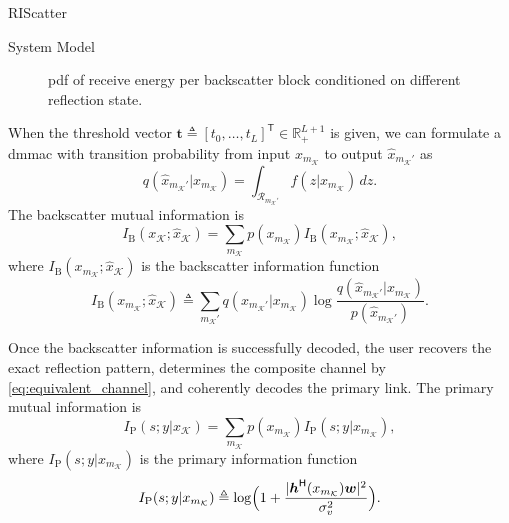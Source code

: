 \documentclass[journal]{IEEEtran}
\begin{document}
\begin{section}{RIScatter}
\begin{subsection}{System Model}
		\begin{figure}[!t]
			\centering
			\resizebox{0.8\columnwidth}{!}{
				
			}
			\caption{
				\gls{pdf} of receive energy per backscatter block conditioned on different reflection state.
			}
			\label{fg:energy_distribution}
		\end{figure}

		When the threshold vector $\boldsymbol{t} \triangleq [t_0,\ldots,t_L]^\mathsf{T} \in \mathbb{R}_+^{L+1}$ is given, we can formulate a \gls{dmmac} with transition probability from input $x_{m_{\mathcal{K}}}$ to output $\hat{x}_{m_{\mathcal{K}}'}$ as
		\begin{equation}
			q(\hat{x}_{m_{\mathcal{K}}'}|x_{m_{\mathcal{K}}}) = \int_{\mathcal{R}_{m_{\mathcal{K}}'}} f(z|x_{m_{\mathcal{K}}}) \, d z.
			\label{eq:dmmac}
		\end{equation}
		The backscatter mutual information is
		\begin{equation}
			I_{\text{B}}(x_{\mathcal{K}};\hat{x}_{\mathcal{K}}) = \sum_{m_{\mathcal{K}}} p(x_{m_{\mathcal{K}}}) I_{\text{B}}(x_{m_{\mathcal{K}}};\hat{x}_{\mathcal{K}}),
			\label{eq:backscatter_mutual_information}
		\end{equation}
		where $I_{\text{B}}(x_{m_{\mathcal{K}}};\hat{x}_{\mathcal{K}})$ is the backscatter information function
		\begin{equation}
			I_{\text{B}}(x_{m_{\mathcal{K}}};\hat{x}_{\mathcal{K}}) \triangleq \sum_{m_{\mathcal{K}}'} q(\hat{x}_{m_{\mathcal{K}}'}|x_{m_{\mathcal{K}}}) \log \frac{q(\hat{x}_{m_{\mathcal{K}}'}|x_{m_{\mathcal{K}}})}{p(\hat{x}_{m_{\mathcal{K}}'})}.
			\label{eq:backscatter_information_function}
		\end{equation}

		Once the backscatter information is successfully decoded, the user recovers the exact reflection pattern, determines the composite channel by \eqref{eq:equivalent_channel}, and coherently decodes the primary link.
		The primary mutual information is
		\begin{equation}
			I_{\text{P}}(s;y|x_{\mathcal{K}}) = \sum_{m_{\mathcal{K}}} p(x_{m_{\mathcal{K}}}) I_{\text{P}}(s;y|x_{m_{\mathcal{K}}}),
			\label{eq:primary_mutual_information}
		\end{equation}
		where $I_{\text{P}}(s;y|x_{m_{\mathcal{K}}})$ is the primary information function
		\begin{equation}
			I_{\text{P}}(s;y|x_{m_{\mathcal{K}}}) \triangleq \log \Bigl(1 + \frac{\lvert \boldsymbol{h}^\mathsf{H}(x_{m_{\mathcal{K}}}) \boldsymbol{w} \rvert^2}{\sigma_v^2}\Bigr).
			\label{eq:primary_information_function}
		\end{equation}
		\label{st:system_model}
	\end{subsection}
	\label{st:riscatter}
\end{section}
\end{document}
